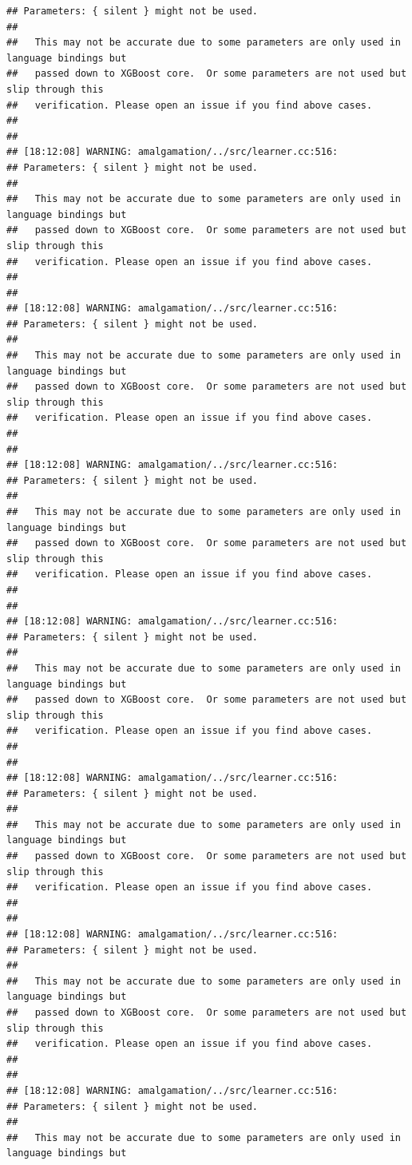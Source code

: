 \documentclass[AMS,STIX2COL]{WileyNJD-v2}\usepackage[]{graphicx}\usepackage[]{color}
\makeatletter
\newenvironment{kframe}{%
 \def\at@end@of@kframe{}%
 \ifinner\ifhmode%
  \def\at@end@of@kframe{\end{minipage}}%
  \begin{minipage}{\columnwidth}%
 \fi\fi%
 \def\FrameCommand##1{\hskip\@totalleftmargin \hskip-\fboxsep
 \colorbox{shadecolor}{##1}\hskip-\fboxsep
     \hskip-\linewidth \hskip-\@totalleftmargin \hskip\columnwidth}%
 \MakeFramed {\advance\hsize-\width
   \@totalleftmargin\z@ \linewidth\hsize
   \@setminipage}}%
 {\par\unskip\endMakeFramed%
 \at@end@of@kframe}
\newenvironment{knitrout}{}{} %
\makeatother
\begin{document}
\begin{knitrout}
\begin{kframe}
\begin{verbatim}
## Parameters: { silent } might not be used.
## 
##   This may not be accurate due to some parameters are only used in language bindings but
##   passed down to XGBoost core.  Or some parameters are not used but slip through this
##   verification. Please open an issue if you find above cases.
## 
## 
## [18:12:08] WARNING: amalgamation/../src/learner.cc:516: 
## Parameters: { silent } might not be used.
## 
##   This may not be accurate due to some parameters are only used in language bindings but
##   passed down to XGBoost core.  Or some parameters are not used but slip through this
##   verification. Please open an issue if you find above cases.
## 
## 
## [18:12:08] WARNING: amalgamation/../src/learner.cc:516: 
## Parameters: { silent } might not be used.
## 
##   This may not be accurate due to some parameters are only used in language bindings but
##   passed down to XGBoost core.  Or some parameters are not used but slip through this
##   verification. Please open an issue if you find above cases.
## 
## 
## [18:12:08] WARNING: amalgamation/../src/learner.cc:516: 
## Parameters: { silent } might not be used.
## 
##   This may not be accurate due to some parameters are only used in language bindings but
##   passed down to XGBoost core.  Or some parameters are not used but slip through this
##   verification. Please open an issue if you find above cases.
## 
## 
## [18:12:08] WARNING: amalgamation/../src/learner.cc:516: 
## Parameters: { silent } might not be used.
## 
##   This may not be accurate due to some parameters are only used in language bindings but
##   passed down to XGBoost core.  Or some parameters are not used but slip through this
##   verification. Please open an issue if you find above cases.
## 
## 
## [18:12:08] WARNING: amalgamation/../src/learner.cc:516: 
## Parameters: { silent } might not be used.
## 
##   This may not be accurate due to some parameters are only used in language bindings but
##   passed down to XGBoost core.  Or some parameters are not used but slip through this
##   verification. Please open an issue if you find above cases.
## 
## 
## [18:12:08] WARNING: amalgamation/../src/learner.cc:516: 
## Parameters: { silent } might not be used.
## 
##   This may not be accurate due to some parameters are only used in language bindings but
##   passed down to XGBoost core.  Or some parameters are not used but slip through this
##   verification. Please open an issue if you find above cases.
## 
## 
## [18:12:08] WARNING: amalgamation/../src/learner.cc:516: 
## Parameters: { silent } might not be used.
## 
##   This may not be accurate due to some parameters are only used in language bindings but

\end{verbatim}
\end{kframe}
\end{knitrout}
\end{document}
